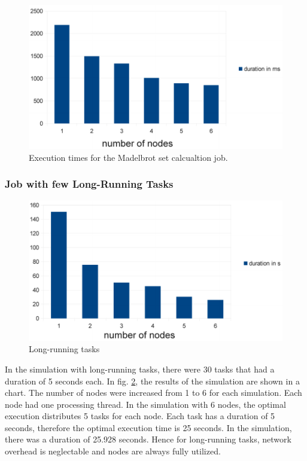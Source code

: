 \documentclass[english]{uzhpub}
\begin{document}
\begin{figure}[h]
\centering
\includegraphics[scale=0.7]{images/amazon-duration.pdf}
\caption{Execution times for the Madelbrot set calcualtion job.}
\label{fig:times-mandelbrot}
\end{figure}

\subsubsection{Job with few Long-Running Tasks}

\begin{figure}[hptb]
\centering
\includegraphics[scale=0.7]{images/long-running-duration.pdf}
\caption{Long-running tasks}
\label{fig:evaluation-long-running}
\end{figure}

In the simulation with long-running tasks, there were 30 tasks that had a duration of 5 seconds each. In fig. \ref{fig:evaluation-long-running}, the results of the simulation are shown in a chart. The number of nodes were increased from 1 to 6 for each simulation. Each node had one processing thread. In the simulation with 6 nodes, the optimal execution distributes 5 tasks for each node. Each task has a duration of 5 seconds, therefore the optimal execution time is 25 seconds. In the simulation, there was a duration of 25.928 seconds. Hence for long-running tasks, network overhead is neglectable and nodes are always fully utilized.
\end{document}
